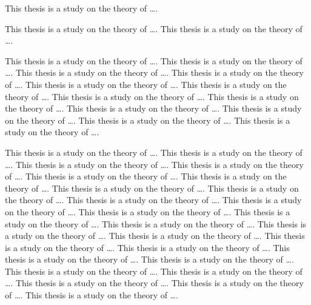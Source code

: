 \begin{enabstract}
This thesis is a study on the theory of \dots.\the\baselineskip

This thesis is a study on the theory of \dots. This thesis is a study on the theory of \dots.\the\baselineskip

This thesis is a study on the theory of \dots. This thesis is a study on the theory of \dots. This thesis is a study on the theory of \dots. This thesis is a study on the theory of \dots. This thesis is a study on the theory of \dots. This thesis is a study on the theory of \dots. This thesis is a study on the theory of \dots. This thesis is a study on the theory of \dots. This thesis is a study on the theory of \dots. This thesis is a study on the theory of \dots. This thesis is a study on the theory of \dots. This thesis is a study on the theory of \dots.\the\baselineskip

This thesis is a study on the theory of \dots. This thesis is a study on the theory of \dots. This thesis is a study on the theory of \dots. This thesis is a study on the theory of \dots. This thesis is a study on the theory of \dots. This thesis is a study on the theory of \dots. This thesis is a study on the theory of \dots. This thesis is a study on the theory of \dots. This thesis is a study on the theory of \dots. This thesis is a study on the theory of \dots. This thesis is a study on the theory of \dots. This thesis is a study on the theory of \dots. This thesis is a study on the theory of \dots. This thesis is a study on the theory of \dots. This thesis is a study on the theory of \dots. This thesis is a study on the theory of \dots. This thesis is a study on the theory of \dots. This thesis is a study on the theory of \dots. This thesis is a study on the theory of \dots. This thesis is a study on the theory of \dots. This thesis is a study on the theory of \dots. This thesis is a study on the theory of \dots. This thesis is a study on the theory of \dots. This thesis is a study on the theory of \dots.\the\baselineskip
\end{enabstract}
